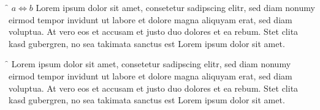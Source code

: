 \documentclass{article}
\begin{document}
\iffalse
Commented stuff
Another \ifstuff here \fi
\ifaa \else \fi
\ifasd \fi \f \fii
$ a \iff b $
Lorem ipsum dolor sit amet, consetetur sadipscing elitr, sed diam nonumy eirmod
tempor invidunt ut labore et dolore magna aliquyam erat, sed diam voluptua. At
vero eos et accusam et justo duo dolores et ea rebum. Stet clita kasd
gubergren, no sea takimata sanctus est Lorem ipsum dolor sit amet.
\fi

\iffalse
Commented stuff
Another \ifstuff here \fi
\ifaa \else \fi
\ifasd \fi \f \fii
\else
Lorem ipsum dolor sit amet, consetetur sadipscing elitr, sed diam nonumy eirmod
tempor invidunt ut labore et dolore magna aliquyam erat, sed diam voluptua. At
vero eos et accusam et justo duo dolores et ea rebum. Stet clita kasd
gubergren, no sea takimata sanctus est Lorem ipsum dolor sit amet.
\fi
\end{document}
